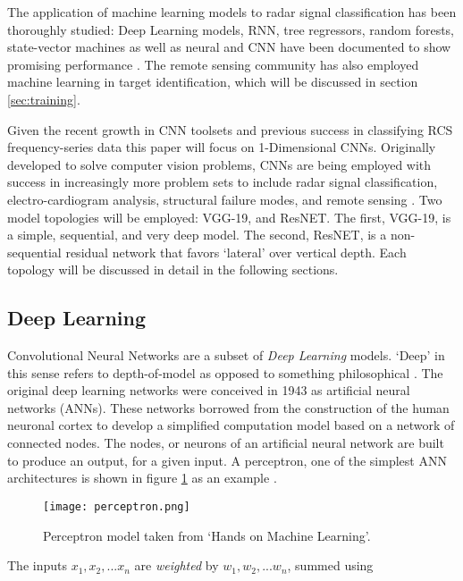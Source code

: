 	The application of machine learning models to radar signal classification has been thoroughly studied:  Deep Learning models, \gls{RNN}, tree regressors, random forests, state-vector machines as well as neural and \gls{CNN} have been documented to show promising performance \cite{ML_Radar_Survey}. The remote sensing community has also employed machine learning in target identification, which will be discussed in section \ref{sec:training}.

	Given the recent growth in CNN toolsets and previous success in classifying RCS frequency-series data this paper will focus on 1-Dimensional CNNs\cite{ML_RCS}. Originally developed to solve computer vision problems, CNNs are being employed with success in increasingly more problem sets to include radar signal classification, electro-cardiogram analysis, structural failure modes, and remote sensing \cite{CNN_Survey}. Two model topologies will be employed:  VGG-19, and ResNET. The first, VGG-19, is a simple, sequential, and very deep model. The second, ResNET, is a non-sequential residual network that favors `lateral' over vertical depth. Each topology will be discussed in detail in the following sections.

	\subsection{ Deep Learning}

		Convolutional Neural Networks are a subset of \textit{Deep Learning} models. `Deep' in this sense refers to depth-of-model as opposed to something philosophical \cite{Chollet}. The original deep learning networks were conceived in 1943 \cite{ANN} as artificial neural networks (ANNs). These networks borrowed from the construction of the human neuronal cortex to develop a simplified computation model based on a network of connected nodes. The nodes, or neurons of an artificial neural network are built to produce an output, for a given input. A perceptron, one of the simplest ANN architectures is shown in figure \ref{fig:percept} as an example \cite{Aurelien}.

		\begin{figure}[htbp]
		  \centering
		   \texttt{[image: perceptron.png]}
		  \caption[Perceptron node]{Perceptron model taken from `Hands on Machine Learning'\cite{Aurelien}.}
		  \label{fig:percept}
		\end{figure}

		The inputs $x_1, x_2, ... x_n$ are \textit{weighted} by $w_1, w_2, ...w_n$, summed using

